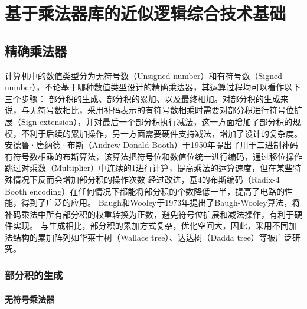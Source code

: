 \chapter{基于乘法器库的近似逻辑综合技术基础}

\section{精确乘法器} \label{精确乘法器}


计算机中的数值类型分为无符号数（Unsigned number）和有符号数（Signed number），不论基于哪种数值类型设计的精确乘法器，其运算过程均可以看作以下三个步骤： 部分积的生成、部分积的累加、以及最终相加。对部分积的生成来说，与无符号数相比，采用补码表示的有符号数相乘时需要对部分积进行符号位扩展（Sign extension），并对最后一个部分积执行减法，这一方面增加了部分积的规模，不利于后续的累加操作，另一方面需要硬件支持减法，增加了设计的复杂度。
安德鲁·唐纳德·布斯（Andrew Donald Booth）于1950年提出了用于二进制补码有符号数相乘的布斯算法\cite{EM:booth_orig}，该算法把符号位和数值位统一进行编码，通过移位操作跳过对乘数（Multiplier）中连续的1进行计算，提高乘法的运算速度，但在某些特殊情况下反而会增加部分积的操作次数%
经过改进，基4的布斯编码（Radix-4 Booth encoding）在任何情况下都能将部分积的个数降低一半\cite{EM:booth_Macsorley,EM:booth_proof}，提高了电路的性能，得到了广泛的应用。
Baugh和Wooley于1973年提出了Baugh-Wooley算法\cite{EM:baugh-wooley}，将补码乘法中所有部分积的权重转换为正数，避免符号位扩展和减法操作，有利于硬件实现。
与生成相比，部分积的累加方式复杂，优化空间大，因此，采用不同加法结构的累加阵列如华莱士树（Wallace tree）\cite{EM:Wallace}、达达树（Dadda tree）\cite{EM:Dadda}等被广泛研究。

\subsection{部分积的生成}

\subsubsection{无符号乘法器}

